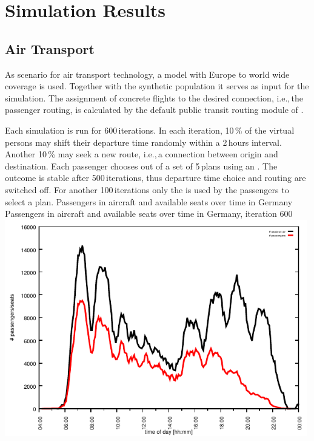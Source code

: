 \section{Simulation Results}
\label{sec:air_rail_results}
\subsection{Air Transport}
As scenario for air transport technology, a model with Europe to world wide coverage is used. 
Together with the synthetic population it serves as input for the simulation.
The assignment of concrete flights to the desired  connection, i.e.,\,the passenger routing, is calculated by the default public transit routing module of .

Each simulation is run for 600\,iterations.
In each iteration, 10\,\% of the virtual persons may shift their departure time randomly within a 2\,hours interval.
Another 10\,\% may seek a new route, i.e.,\,a connection between origin and destination. 
Each passenger chooses out of a set of 5\,plans using an .
The outcome is stable after 500\,iterations, thus departure time choice and routing are switched off. 
For another 100\,iterations only the  is used by the passengers to select a plan. 
%
\createfigure%
{Passengers in aircraft and available seats over time in Germany}%
{Passengers in aircraft and available seats over time in Germany, iteration 600}%
{\label{fig:2009_passengers_seats}}%
{\includegraphics[width=0.99\textwidth, angle=0]{./extending/figures/air/in_vehicle_histogram_flight_1876_it_600.pdf}}%
{}

